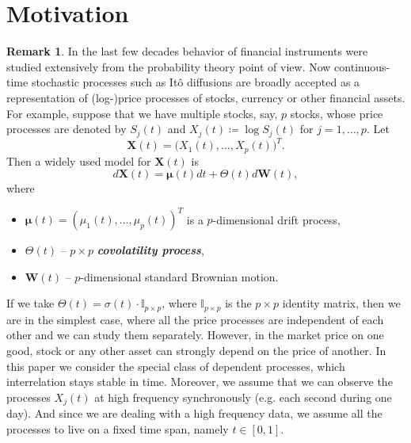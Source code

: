 \documentclass[a4paper,11pt]{book}
\theoremstyle{plain}
\theoremstyle{definition}
\newtheorem{rmrk}[thm]{Remark}
\newcommand{\define}[1]{\textit{\textbf{#1}}}
\begin{document}
	\section{Motivation}
	\begin{rmrk}
		In the last few decades behavior of financial instruments were studied extensively from the probability theory point of view. Now continuous-time stochastic processes such as Itô diffusions are broadly accepted as a representation of (log-)price processes of stocks, currency or other financial assets. For example, suppose that we have multiple stocks, say, $p$ stocks, whose price processes are denoted by $S_j(t)$ and $X_j(t) \coloneqq \log S_j(t)$ for $j = 1, \dots, p$. Let
		\[ \mathbf{X}(t) = \big(X_1(t), \dots, X_p(t)\big)^T. \]
		Then a widely used model for $\mathbf{X}(t)$ is
		\begin{equation} \label{X diffeq}
		d\mathbf{X}(t) = \boldsymbol{\mu}(t) dt + \Theta(t) d\mathbf{W}(t),
		\end{equation}
		where 
		\begin{itemize}
			\item $\boldsymbol{\mu}(t) = (\mu_1(t), \dots, \mu_p(t))^T$ is a $p$-dimensional drift process,
			\item $\Theta(t)$ -- $p \times p$ \define{covolatility process},
			\item $\mathbf{W}(t)$ -- $p$-dimensional standard Brownian motion.
		\end{itemize}
		If we take $\Theta(t) = \sigma(t) \cdot \mathbb{I}_{p \times p} $, where $\mathbb{I}_{p \times p}$ is the $p \times p$ identity matrix, then we are in the simplest case, where all the price processes are independent of each other and we can study them separately. However, in the market price on one good, stock or any other asset can strongly depend on the price of another. In this paper we consider the special class of dependent processes, which interrelation stays stable in time. Moreover, we assume that we can observe the processes $X_j(t)$ at high frequency synchronously (e.g. each second during one day). And since we are dealing with a high frequency data, we assume all the processes to live on a fixed time span, namely $t \in [0, 1]$. \\
	\end{rmrk}
\end{document}
